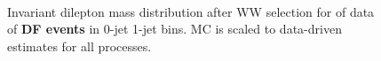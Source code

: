 \begin{figure}[!hbtp]
\centering
{}
 \\
\caption{Invariant dilepton mass distribution after WW selection for \intlumiEightTeV of data  
of {\bf DF events} in 0-jet  1-jet  bins.   
MC is scaled to data-driven estimates for all processes.}
\label{fig:ww_dilmass}
\end{figure}

